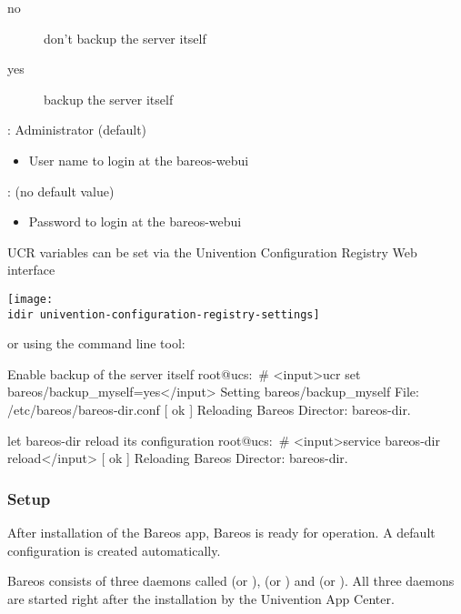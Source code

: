\begin{description}
\begin{description}
	\item[no] don't backup the server itself
	\item[yes] backup the server itself
      \end{description}
        \item[\parameter{bareos/webui/console/user1/username}]: Administrator (default)
      \begin{itemize}
        \item User name to login at the bareos-webui
      \end{itemize}
        \item[\parameter{bareos/webui/console/user1/password}]: (no default value)
      \begin{itemize}
        \item Password to login at the bareos-webui
      \end{itemize}
    \end{description}

UCR variables can be set via the Univention Configuration Registry Web interface

\begin{center}
  \texttt{[image: \\idir univention-configuration-registry-settings]}
\end{center}

or using the  command line tool:
\begin{commands}{Enable backup of the server itself}
root@ucs:~# <input>ucr set bareos/backup_myself=yes</input>
Setting bareos/backup_myself
File: /etc/bareos/bareos-dir.conf
[ ok ] Reloading Bareos Director: bareos-dir.
\end{commands}

\begin{commands}{let bareos-dir reload its configuration}
root@ucs:~# <input>service  bareos-dir reload</input>
[ ok ] Reloading Bareos Director: bareos-dir.
\end{commands}

\subsubsection{Setup}

After installation of the Bareos app, Bareos is ready for operation. A default configuration is created automatically.

Bareos consists of three daemons called  (or ),  (or ) and  (or ). All three daemons are started right after the installation by the Univention App Center.

